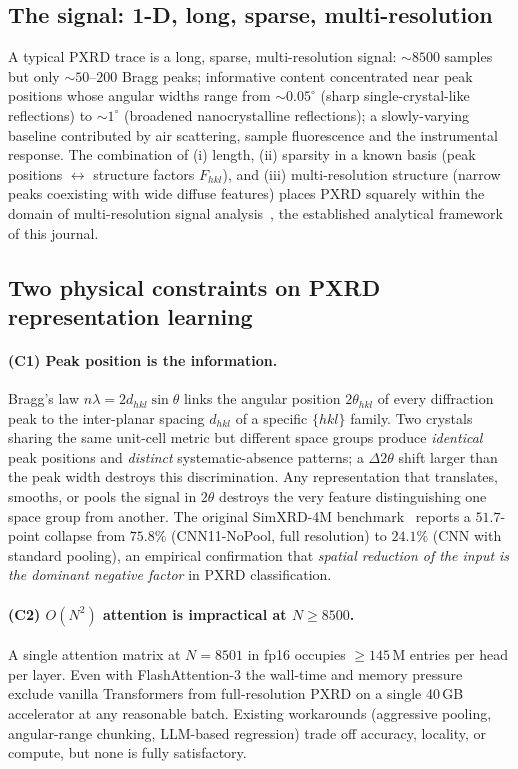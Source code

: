 \documentclass[final]{ws-ijwmip}
\begin{document}
\subsection{The signal: 1-D, long, sparse, multi-resolution}

\label{sub:signal}

A typical PXRD trace is a long, sparse, multi-resolution signal:
$\sim 8500$ samples but only $\sim 50$--$200$ Bragg peaks; informative
content concentrated near peak positions whose angular widths range from
$\sim 0.05^\circ$ (sharp single-crystal-like reflections) to $\sim 1^\circ$
(broadened nanocrystalline reflections); a slowly-varying baseline
contributed by air scattering, sample fluorescence and the instrumental
response. The combination of (i) length, (ii) sparsity in a known basis
(peak positions $\leftrightarrow$ structure factors $F_{hkl}$), and
(iii) multi-resolution structure (narrow peaks coexisting with wide
diffuse features) places PXRD squarely within the domain of multi-resolution
signal analysis~\cite{daubechies1992, mallat1999}, the established
analytical framework of this journal.


\subsection{Two physical constraints on PXRD representation learning}

\paragraph{(C1) Peak position is the information.}
Bragg's law $n\lambda=2d_{hkl}\sin\theta$ links the angular position
$2\theta_{hkl}$ of every diffraction peak to the inter-planar spacing
$d_{hkl}$ of a specific $\{hkl\}$ family. Two crystals sharing the same
unit-cell metric but different space groups produce \emph{identical} peak
positions and \emph{distinct} systematic-absence patterns; a $\Delta 2\theta$
shift larger than the peak width destroys this discrimination. Any
representation that translates, smooths, or pools the signal in
$2\theta$ destroys the very feature distinguishing one space group from
another. The original SimXRD-4M benchmark~\cite{caobin2025simxrd} reports
a $51.7$-point collapse from $75.8\%$ (CNN11-NoPool, full resolution) to
$24.1\%$ (CNN with standard pooling), an empirical confirmation that
\emph{spatial reduction of the input is the dominant negative factor}
in PXRD classification.

\paragraph{(C2) $O(N^2)$ attention is impractical at $N\geq 8500$.}
A single attention matrix at $N=8501$ in fp16 occupies $\geq 145\,$M
entries per head per layer. Even with FlashAttention-3 the wall-time and
memory pressure exclude vanilla Transformers from full-resolution PXRD on
a single 40\,GB accelerator at any reasonable batch. Existing workarounds
(aggressive pooling, angular-range chunking, LLM-based regression) trade
off accuracy, locality, or compute, but none is fully satisfactory.
\end{document}
